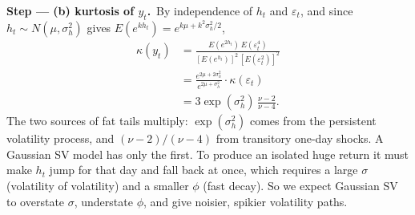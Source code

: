 \documentclass[11pt,a4paper]{article}
\newcommand{\passo}[2]{\par\smallskip\noindent\textbf{Step --- #1.}~#2}
\begin{document}
\begin{sol}
\passo{(b) kurtosis of $y_t$}{By independence of $h_t$ and $\varepsilon_t$, and since $h_t\sim N(\mu,\sigma_h^2)$
gives $E(e^{kh_t})=e^{k\mu+k^2\sigma_h^2/2}$,}
\begin{align*}
\kappa(y_t) &= \frac{E(e^{2h_t})\,E(\varepsilon_t^4)}{[E(e^{h_t})]^2\,[E(\varepsilon_t^2)]^2}\\
&= \frac{e^{2\mu+2\sigma_h^2}}{e^{2\mu+\sigma_h^2}}\cdot\kappa(\varepsilon_t)\\
&= 3\exp(\sigma_h^2)\,\frac{\nu-2}{\nu-4}.
\end{align*}
The two sources of fat tails multiply: $\exp(\sigma_h^2)$ comes from the persistent volatility process, and
$(\nu-2)/(\nu-4)$ from transitory one-day shocks. A Gaussian SV model has only the first. To produce an isolated
huge return it must make $h_t$ jump for that day and fall back at once, which requires a large $\sigma$
(volatility of volatility) and a smaller $\phi$ (fast decay). So we expect Gaussian SV to overstate $\sigma$,
understate $\phi$, and give noisier, spikier volatility paths.


\end{sol}
\end{document}
